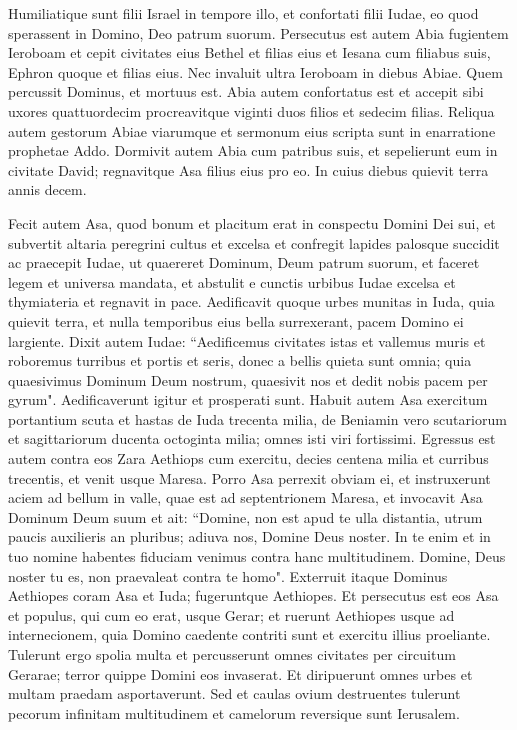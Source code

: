 \begin{biblechapter}
\verse Humiliatique sunt filii Israel in tempore illo, et confortati filii Iudae, eo quod sperassent in Domino, Deo patrum suorum. 
\verse Persecutus est autem Abia fugientem Ieroboam et cepit civitates eius Bethel et filias eius et Iesana cum filiabus suis, Ephron quoque et filias eius. 
\verse Nec invaluit ultra Ieroboam in diebus Abiae. Quem percussit Dominus, et mortuus est. 
\verse Abia autem confortatus est et accepit sibi uxores quattuordecim procreavitque viginti duos filios et sedecim filias. 
\verse Reliqua autem gestorum Abiae viarumque et sermonum eius scripta sunt in enarratione prophetae Addo. 
\verse Dormivit autem Abia cum patribus suis, et sepelierunt eum in civitate David; regnavitque Asa filius eius pro eo. In cuius diebus quievit terra annis decem. 
\end{biblechapter}

\begin{biblechapter}  
\verse Fecit autem Asa, quod bonum et placitum erat in conspectu Domini Dei sui, et subvertit altaria peregrini cultus et excelsa 
\verse et confregit lapides palosque succidit 
\verse ac praecepit Iudae, ut quaereret Dominum, Deum patrum suorum, et faceret legem et universa mandata, 
\verse et abstulit e cunctis urbibus Iudae excelsa et thymiateria et regnavit in pace. 
\verse Aedificavit quoque urbes munitas in Iuda, quia quievit terra, et nulla temporibus eius bella surrexerant, pacem Domino ei largiente. 
\verse Dixit autem Iudae: “Aedificemus civitates istas et vallemus muris et roboremus turribus et portis et seris, donec a bellis quieta sunt omnia; quia quaesivimus Dominum Deum nostrum, quaesivit nos et dedit nobis pacem per gyrum". Aedificaverunt igitur et prosperati sunt. 
\verse Habuit autem Asa exercitum portantium scuta et hastas de Iuda trecenta milia, de Beniamin vero scutariorum et sagittariorum ducenta octoginta milia; omnes isti viri fortissimi. 
\verse Egressus est autem contra eos Zara Aethiops cum exercitu, decies centena milia et curribus trecentis, et venit usque Maresa. 
\verse Porro Asa perrexit obviam ei, et instruxerunt aciem ad bellum in valle, quae est ad septentrionem Maresa,  
\verse et invocavit Asa Dominum Deum suum et ait: “Domine, non est apud te ulla distantia, utrum paucis auxilieris an pluribus; adiuva nos, Domine Deus noster. In te enim et in tuo nomine habentes fiduciam venimus contra hanc multitudinem. Domine, Deus noster tu es, non praevaleat contra te homo". 
\verse Exterruit itaque Dominus Aethiopes coram Asa et Iuda; fugeruntque Aethiopes. 
\verse Et persecutus est eos Asa et populus, qui cum eo erat, usque Gerar; et ruerunt Aethiopes usque ad internecionem, quia Domino caedente contriti sunt et exercitu illius proeliante. Tulerunt ergo spolia multa 
\verse et percusserunt omnes civitates per circuitum Gerarae; terror quippe Domini eos invaserat. Et diripuerunt omnes urbes et multam praedam asportaverunt. 
\verse Sed et caulas ovium destruentes tulerunt pecorum infinitam multitudinem et camelorum reversique sunt Ierusalem. 
\end{biblechapter}

